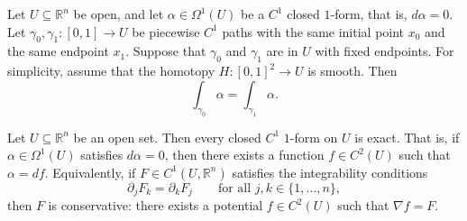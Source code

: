 \begin{theorem}
\label{thm:poincare_lemma}
Let $U \subseteq \mathbb{R}^n$ be open, and let $\alpha \in \Omega^1(U)$ be a $C^1$ closed $1$-form, that is, $d\alpha = 0$.
Let $\gamma_0, \gamma_1 : [0,1] \to U$ be piecewise $C^1$ paths with the same initial point $x_0$ and the same endpoint $x_1$. Suppose that $\gamma_0$ and $\gamma_1$ are  in $U$ with fixed endpoints. For simplicity, assume that the homotopy $H : [0,1]^2 \to U$ is smooth. Then
\[\int_{\gamma_0} \alpha = \int_{\gamma_1} \alpha.\]
\end{theorem}

\begin{corollary}
\label{cor:potentials_simply_connected}
Let $U \subseteq \mathbb{R}^n$ be an open  set. Then every closed $C^1$ $1$-form on $U$ is exact. That is, if $\alpha \in \Omega^1(U)$ satisfies $d\alpha = 0$, then there exists a function $f \in C^2(U)$ such that $\alpha = df$.
Equivalently, if $F \in C^1(U, \mathbb{R}^n)$ satisfies the integrability conditions
\[\partial_j F_k = \partial_k F_j \qquad \text{for all } j, k \in \{1,\dots,n\},\]
then $F$ is conservative: there exists a potential $f \in C^2(U)$ such that $\nabla f = F$.
\end{corollary}

